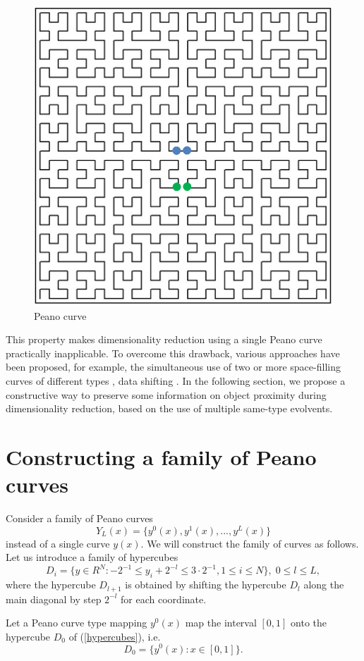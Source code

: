 \documentclass[entropy,article,submit,moreauthors,pdftex]{Definitions/mdpi}
\begin{document}
\begin{figure}
\center
\includegraphics[width=0.5\linewidth]{fig1.png}
\caption{Peano curve}\label{fig:Peano}
\label{fig1}
\end{figure}   

This property makes dimensionality reduction using a single Peano curve practically inapplicable. To overcome this drawback, various approaches have been proposed, for example, the simultaneous use of two or more space-filling curves of different types \cite{Scott1999}, data shifting \cite{Liao2001}. In the following section, we propose a constructive way to preserve some information on object proximity during dimensionality reduction, based on the use of multiple same-type evolvents.

\section{Constructing a family of Peano curves}\label{MPeano}

Consider a family of Peano curves
\begin{equation}
Y_L(x)=\{ y^0(x), y^1(x), ..., y^L(x) \}
\end{equation} 
instead of a single curve $y(x)$. We will construct the family of curves as follows. Let us introduce a family of hypercubes
\begin{equation}\label{hypercubes}
D_i = \{ y \in R^N: -2^{-1} \leq y_i + 2^{-l} \leq 3 \cdot 2^{-1},  1 \leq i \leq N \}, \; 0 \leq l \leq L,
\end{equation} 
where the hypercube $D_{l+1}$ is obtained by shifting the hypercube $D_l$ along the main diagonal by step $2^{-l}$ for each coordinate.

Let a Peano curve type mapping $y^0(x)$ map the interval $[0,1]$ onto the hypercube $D_0$ of (\ref{hypercubes}), i.e.
\begin{equation}\label{hypercubeD0}
D_0 = \{y^0(x): x \in [0, 1] \}.
\end{equation} 
\end{document}
